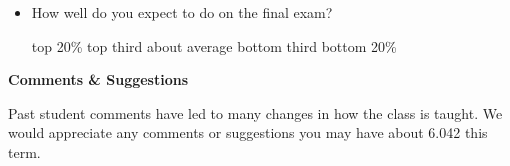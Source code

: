 \documentclass[handout]{mcs}
\begin{document}
\begin{itemize}
\begin{itemize}
\item How well do you expect to do on the final exam?

\begin{center}
top 20\%\hspace{0.3in} top third \hspace{0.3in} about average\hspace{0.3in}  bottom third \hspace{0.3in} 
 bottom 20\%
\end{center}

\end{itemize}

\iffalse

\item \textbf{Summary}

\begin{itemize}
\item How well do you think you have understood the material?

\begin{center}
very well\hspace{0.3in} adequately\hspace{0.3in} partially\hspace{0.3in} poorly
\end{center}

\item What should we do to improve this?

\begin{center}
more problem videos\hspace{0.3in} less material covered\hspace{0.3in} graded psets\hspace{0.3in} other:\brule{0.5in}
\end{center}
\fi


\end{itemize}

\newpage

\begin{center}
\large  \textbf{Comments \& Suggestions}
\end{center}

Past student comments have led to many changes in how the class is
taught.  We would appreciate any comments or suggestions you may have
about 6.042 this term.
\end{document}
